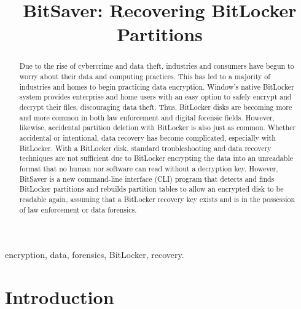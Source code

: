 \documentclass[conference]{IEEEtran} \IEEEoverridecommandlockouts
\begin{document}
\title{BitSaver: Recovering BitLocker Partitions\\}

\author{  }

\maketitle

\begin{abstract} Due to the rise of cybercrime and data theft, industries
	and consumers have begun to worry about their data and computing 
	practices. This has led to
	a majority of industries and homes to begin practicing
	data encryption. Window's native BitLocker system provides enterprise and
	home users with an easy option to safely encrypt and decrypt their files, discouraging
	data theft. Thus, BitLocker disks are becoming more and more common in
	both law enforcement and digital forensic fields. However, likewise, accidental partition deletion with
	BitLocker is also just as common. Whether accidental or intentional, 
	data recovery has become complicated, especially with BitLocker. 
	With a BitLocker disk, standard troubleshooting and data recovery techniques are not 
	sufficient due to BitLocker encrypting the data into an unreadable format
	that no human nor software can read without a decryption key. However, BitSaver is a new command-line interface (CLI) program that
	detects and finds BitLocker partitions and rebuilds partition tables to
allow an encrypted disk to be readable again, assuming that a BitLocker
recovery key exists and is in the possession of law enforcement or data
forensics. \end{abstract}

\begin{IEEEkeywords} encryption, data, forensics, BitLocker, recovery.
\end{IEEEkeywords}

\section{Introduction}
\end{document}
